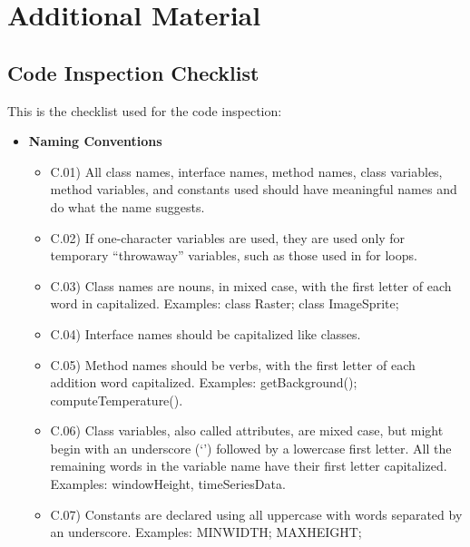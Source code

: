 \documentclass[../../codeInspection.tex]{subfiles}
\begin{document}
	\chapter{Additional Material}

		\section{Code Inspection Checklist}

			This is the checklist used for the code inspection:

			\begin{itemize}
				
				\item  	\textbf{Naming Conventions}
						\begin{itemize}

					  		\item C.01)\label{C:01} All class names, interface names, method names, class variables, method variables, and constants used should have meaningful names and do what the name suggests.

					  		\item C.02)\label{C:02} If one-character variables are used, they are used only for temporary “throwaway” variables, such as those used in for loops.

					  		\item C.03)\label{C:03} Class names are nouns, in mixed case, with the first letter of each word in capitalized. Examples: class Raster; class ImageSprite;

					  		\item C.04)\label{C:04} Interface names should be capitalized like classes.

					  		\item C.05)\label{C:05} Method names should be verbs, with the first letter of each addition word capitalized. Examples: getBackground(); computeTemperature().

					  		\item C.06)\label{C:06} Class variables, also called attributes, are mixed case, but might begin with an underscore (‘\textunderscore’) followed by a lowercase first letter. All the remaining words in the variable name have their first letter capitalized. Examples: \textunderscore windowHeight, timeSeriesData.

					  		\item C.07)\label{C:07} Constants are declared using all uppercase with words separated by an underscore. Examples: MIN\textunderscore WIDTH; MAX\textunderscore HEIGHT;


\end{itemize}
\end{itemize}
\end{document}
